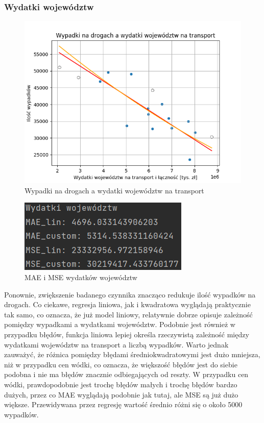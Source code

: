 \documentclass[10pt]{article}
\begin{document}
\subsubsection{Wydatki województw}
\begin{figure}[h]
\begin{center}
\includegraphics[width=0.5\linewidth]{images/plots/woj.png}
\caption{Wypadki na drogach a wydatki województw na transport}
\end{center}
\end{figure}
\begin{figure}[h]
\begin{center}
\includegraphics[width=0.5\linewidth]{images/errors/woj_errors.png}
\caption{MAE i MSE wydatków województw}
\end{center}
\end{figure}
Ponownie, zwiększenie badanego czynnika znacząco redukuje ilość wypadków na drogach. Co ciekawe, regresja liniowa, jak i kwadratowa wyglądają praktycznie tak samo, co oznacza, że już model liniowy, relatywnie dobrze opisuje zależność pomiędzy wypadkami a wydatkami województw. Podobnie jest również w przypadku błędów, funkcja liniowa lepiej określa rzeczywistą zależność między wydatkami województw na transport a liczbą wypadków. Warto jednak zauważyć, że różnica pomiędzy błędami średniokwadratowymi jest dużo mniejsza, niż w przypadku cen wódki, co oznacza, że większość błędów jest do siebie podobna i nie ma błędów znacznie odbiegających od reszty. W przypadku cen wódki, prawdopodobnie jest trochę błędów małych i trochę błędów bardzo dużych, przez co MAE wyglądają podobnie jak tutaj, ale MSE są już dużo większe. Przewidywana przez regresję wartość średnio różni się o około 5000 wypadków.
\pagebreak
\end{document}
